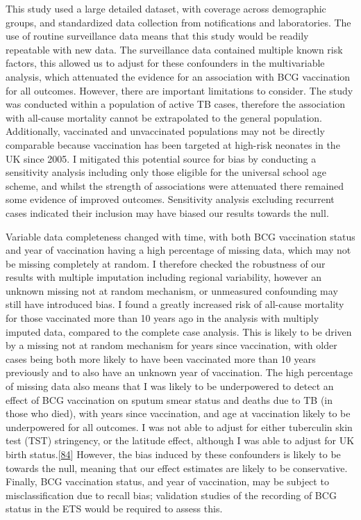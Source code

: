 \documentclass[11pt,twoside]{bristolthesis}
\begin{document}
  This study used a large detailed dataset, with coverage across demographic groups, and standardized data collection from notifications and laboratories. The use of routine surveillance data means that this study would be readily repeatable with new data. The surveillance data contained multiple known risk factors, this allowed us to adjust for these confounders in the multivariable analysis, which attenuated the evidence for an association with BCG vaccination for all outcomes. However, there are important limitations to consider. The study was conducted within a population of active TB cases, therefore the association with all-cause mortality cannot be extrapolated to the general population. Additionally, vaccinated and unvaccinated populations may not be directly comparable because vaccination has been targeted at high-risk neonates in the UK since 2005. I mitigated this potential source for bias by conducting a sensitivity analysis including only those eligible for the universal school age scheme, and whilst the strength of associations were attenuated there remained some evidence of improved outcomes. Sensitivity analysis excluding recurrent cases indicated their inclusion may have biased our results towards the null.
  
  Variable data completeness changed with time, with both BCG vaccination status and year of vaccination having a high percentage of missing data, which may not be missing completely at random. I therefore checked the robustness of our results with multiple imputation including regional variability, however an unknown missing not at random mechanism, or unmeasured confounding may still have introduced bias. I found a greatly increased risk of all-cause mortality for those vaccinated more than 10 years ago in the analysis with multiply imputed data, compared to the complete case analysis. This is likely to be driven by a missing not at random mechanism for years since vaccination, with older cases being both more likely to have been vaccinated more than 10 years previously and to also have an unknown year of vaccination. The high percentage of missing data also means that I was likely to be underpowered to detect an effect of BCG vaccination on sputum smear status and deaths due to TB (in those who died), with years since vaccination, and age at vaccination likely to be underpowered for all outcomes. I was not able to adjust for either tuberculin skin test (TST) stringency, or the latitude effect, although I was able to adjust for UK birth status.{[}\protect\hyperlink{ref-Roy2014b}{84}{]} However, the bias induced by these confounders is likely to be towards the null, meaning that our effect estimates are likely to be conservative. Finally, BCG vaccination status, and year of vaccination, may be subject to misclassification due to recall bias; validation studies of the recording of BCG status in the ETS would be required to assess this.
  
\end{document}
